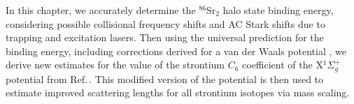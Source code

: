 In this chapter, we accurately determine the $^{86}$Sr$_2$ halo state binding energy, considering possible collisional frequency shifts and AC Stark shifts due to trapping and excitation lasers.
Then using the universal prediction for the binding energy, including corrections derived for a van der Waals potential \hl{\cite{gfl93,Gao01,gao04}}, we derive new estimates for the value of the strontium $C_6$ coefficient of the X$^1\Sigma_g^+$ potential from Ref.\,\hl{\cite{Stein2010}}.
This modified version of the potential is then used to estimate improved scattering lengths for all strontium isotopes via mass scaling.

